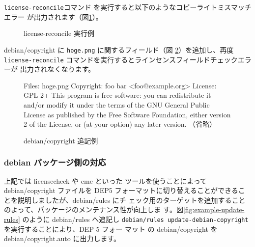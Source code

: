\documentclass[mingoth,a4paper]{jsarticle}
\begin{document}
\texttt{license-reconcile}コマンド を実行すると以下のようなコピーライトミスマッチエラー
が出力されます（図\ref{fig:example-license-reconcile}）。

\begin{figure}[htbp]
\begin{center}
\end{center}
\caption{license-reconcile 実行例}
\label{fig:example-license-reconcile}
\end{figure}

debian/copyright に \texttt{hoge.png} に関するフィールド（図
\ref{fig:example-update-copyright}）を追加し、再度
\texttt{license-reconcile} コマンドを実行するとラインセンスフィールドチェックエラーが
出力されなくなります。

\begin{figure}[htbp]
\begin{center}
\begin{commandline}
Files: hoge.png
Copyright: foo bar <foo@example.org>
License: GPL-2+
 This program is free software: you can redistribute it and/or modify
 it under the terms of the GNU General Public License as published by
 the Free Software Foundation, either version 2 of the License, or
 (at your option) any later version.
（省略）
\end{commandline}
\end{center}
\caption{debian/copyright 追記例}
\label{fig:example-update-copyright}
\end{figure}

\subsubsection{debian パッケージ側の対応}

上記では licensecheck や cme といった ツールを使うことによって debian/copyright ファイルを
DEP5 フォーマットに切り替えることができることを説明しましたが、debian/rules にチ
ェック用のターゲットを追加することのよって、パッケージのメンテナンス性が向上しま
す。図\ref{fig:example-update-rules} のように debian/rules へ追記し
\texttt{debian/rules update-debian-copyright}を実行することにより、DEP 5 フォー
マット の debian/copyright を debian/copyright.auto に出力します。
\end{document}
